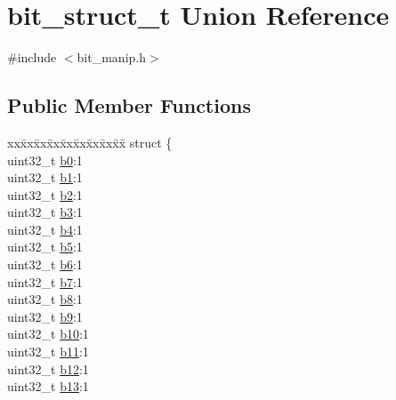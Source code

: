 \hypertarget{unionbit__struct__t}{}\section{bit\+\_\+struct\+\_\+t Union Reference}
\label{unionbit__struct__t}


{\ttfamily \#include $<$bit\+\_\+manip.\+h$>$}

\subsection*{Public Member Functions}
\begin{DoxyCompactItemize}
\item 
\begin{tabbing}
xx\=xx\=xx\=xx\=xx\=xx\=xx\=xx\=xx\=\kill
struct \{\\
\>uint32\_t \hyperlink{unionbit__struct__t_a491397476dce030620dce42378042a5f}{b0}:1\\
\>uint32\_t \hyperlink{unionbit__struct__t_a1fbc5467ca270de23091f7127a5f23ae}{b1}:1\\
\>uint32\_t \hyperlink{unionbit__struct__t_a21a2b2861dab2bdda694f1732811df54}{b2}:1\\
\>uint32\_t \hyperlink{unionbit__struct__t_ae7418fe6c642ce8f2866e2355f60860c}{b3}:1\\
\>uint32\_t \hyperlink{unionbit__struct__t_a1c1a84e7db8333fd9aa7c83906ea27e7}{b4}:1\\
\>uint32\_t \hyperlink{unionbit__struct__t_a919690e64bc87e27bd9aa7b81602c014}{b5}:1\\
\>uint32\_t \hyperlink{unionbit__struct__t_a70281a97aeb203f6a1a2cef287f65310}{b6}:1\\
\>uint32\_t \hyperlink{unionbit__struct__t_a9e54fbbf4588aa5b767a14c9dc238c85}{b7}:1\\
\>uint32\_t \hyperlink{unionbit__struct__t_a246a1636e6d8628ac7f5d3b515d283b6}{b8}:1\\
\>uint32\_t \hyperlink{unionbit__struct__t_a79aed403b826c5ca3e1541843819b2bd}{b9}:1\\
\>uint32\_t \hyperlink{unionbit__struct__t_ac7cc1cf2b4b50371f91f75678f0ff82b}{b10}:1\\
\>uint32\_t \hyperlink{unionbit__struct__t_a371340740c1742dc85b3df7c1e63fd33}{b11}:1\\
\>uint32\_t \hyperlink{unionbit__struct__t_a2c6a929678dd473e96879c9d6083d5bd}{b12}:1\\
\>uint32\_t \hyperlink{unionbit__struct__t_aaddb699fd9994c6bfaf9d5edeac0ce5c}{b13}:1\\

\end{tabbing}
\end{DoxyCompactItemize}
